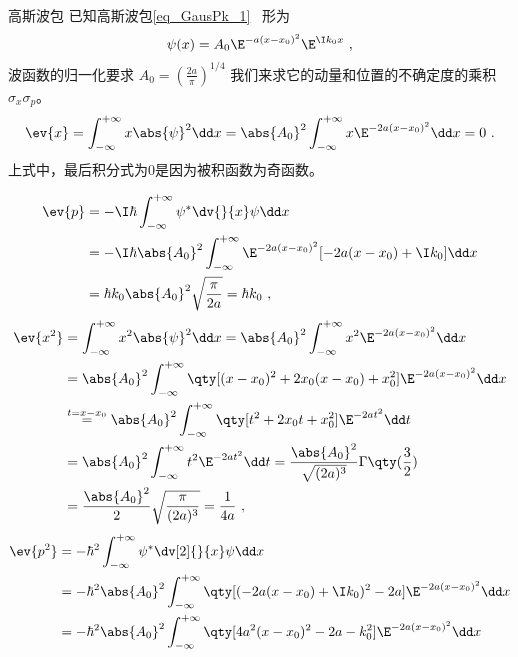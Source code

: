 \begin{example}{高斯波包}\label{ex_Uncert_1}
已知高斯波包\autoref{eq_GausPk_1}~ 形为
\begin{equation}
\psi(x)=A_0\E^{-a(x-x_0)^2}\E^{\I k_0x}~,
\end{equation}
波函数的归一化要求 $A_0=(\frac{2a}{\pi})^{1/4}$
我们来求它的动量和位置的不确定度的乘积 $\sigma_x\sigma_p$。
\begin{equation}\label{eq_Uncert_4}
\ev{x}=\int_{-\infty}^{+\infty}x\abs{\psi}^2\dd x=\abs{A_0}^2\int_{-\infty}^{+\infty}x\E^{-2a(x-x_0)^2}\dd x=0~.
\end{equation}
上式中，最后积分式为0是因为被积函数为奇函数。

\begin{equation}
\begin{aligned}
\ev{p}&=-\I\hbar\int_{-\infty}^{+\infty}\psi^{*}\dv{}{x}\psi\dd x\\
&=-\I\hbar\abs{A_0}^2\int_{-\infty}^{+\infty}\E^{-2a(x-x_0)^2}[-2a(x-x_0)+\I k_0]\dd x\\
&=\hbar k_0\abs{A_0}^2\sqrt{\frac{\pi}{2a}}=\hbar k_0~,
\end{aligned}
\end{equation}
\begin{equation}
\begin{aligned}
\ev{x^2}&=\int_{-\infty}^{+\infty}x^2\abs{\psi}^2\dd x=\abs{A_0}^2\int_{-\infty}^{+\infty}x^2\E^{-2a(x-x_0)^2}\dd x\\
&=\abs{A_0}^2\int_{-\infty}^{+\infty}\qty[(x-x_0)^2+2x_0(x-x_0)+x_0^2]\E^{-2a(x-x_0)^2}\dd x\\
&\overset{t=x-x_0}{=}\abs{A_0}^2\int_{-\infty}^{+\infty}\qty[t^2+2x_0t+x_0^2]\E^{-2at^2}\dd t\\
&=\abs{A_0}^2\int_{-\infty}^{+\infty}t^2\E^{-2at^2}\dd t
=\frac{\abs{A_0}^2}{\sqrt{(2a)^3}}\Gamma\qty(\frac{3}{2})\\
&=\frac{\abs{A_0}^2}{2}\sqrt{\frac{\pi}{(2a)^3}}=\frac{1}{4a}~,
\end{aligned}
\end{equation}
\begin{equation}
\begin{aligned}
\ev{p^2}&=-\hbar^2 \int_{-\infty}^{+\infty}\psi^{*}\dv[2]{}{x}\psi\dd x\\
&=-\hbar^2\abs{A_0}^2\int_{-\infty}^{+\infty}\qty[(-2a(x-x_0)+\I k_0)^2-2a]\E^{-2a(x-x_0)^2}\dd x\\
&=-\hbar^2\abs{A_0}^2\int_{-\infty}^{+\infty}\qty[4a^2(x-x_0)^2-2a-k_0^2]\E^{-2a(x-x_0)^2}\dd x\\

\end{aligned}
\end{equation}
\end{example}
